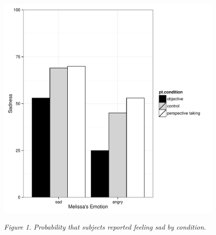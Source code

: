 \documentclass[man,a4paper,noextraspace,apacite]{apa6}\usepackage[]{graphicx}\usepackage[]{color}
\makeatletter
\def\maxwidth{ %
  \ifdim\Gin@nat@width>\linewidth
    \linewidth
  \else
    \Gin@nat@width
  \fi
}
\newenvironment{knitrout}{}{} %
\makeatother
\begin{document}
\begin{figure}
\begin{knitrout}
\color{fgcolor}
\includegraphics[width=\maxwidth]{figure/Figure1Sad-1} 

\end{knitrout}
\textit{Figure 1. Probability that subjects reported feeling sad by condition.}
\end{figure}
\end{document}
